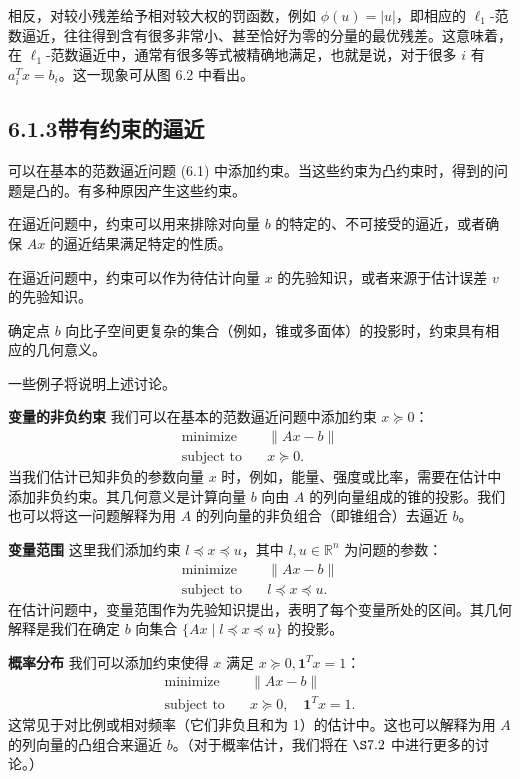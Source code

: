 \documentclass[UTF8,12pt,a4paper,fontset=fandol]{ctexart}
\begin{document}
相反，对较小残差给予相对较大权的罚函数，例如 $\phi(u)=|u|$，即相应的 $\ell_1$-范数逼近，往往得到含有很多非常小、甚至恰好为零的分量的最优残差。这意味着，在 $\ell_1$-范数逼近中，通常有很多等式被精确地满足，也就是说，对于很多 $i$ 有 $a_i^Tx=b_i$。这一现象可从图 6.2 中看出。

\subsection*{6.1.3\quad 带有约束的逼近}

可以在基本的范数逼近问题 (6.1) 中添加约束。当这些约束为凸约束时，得到的问题是凸的。有多种原因产生这些约束。

在逼近问题中，约束可以用来排除对向量 $b$ 的特定的、不可接受的逼近，或者确保 $Ax$ 的逼近结果满足特定的性质。

在逼近问题中，约束可以作为待估计向量 $x$ 的先验知识，或者来源于估计误差 $v$ 的先验知识。

确定点 $b$ 向比子空间更复杂的集合（例如，锥或多面体）的投影时，约束具有相应的几何意义。

一些例子将说明上述讨论。

\noindent\textbf{变量的非负约束}\quad
我们可以在基本的范数逼近问题中添加约束 $x\succeq 0$：
\[
\begin{aligned}
\text{minimize}\quad & \|Ax-b\|\\
\text{subject to}\quad & x\succeq 0.
\end{aligned}
\]
当我们估计已知非负的参数向量 $x$ 时，例如，能量、强度或比率，需要在估计中添加非负约束。其几何意义是计算向量 $b$ 向由 $A$ 的列向量组成的锥的投影。我们也可以将这一问题解释为用 $A$ 的列向量的非负组合（即锥组合）去逼近 $b$。

\noindent\textbf{变量范围}\quad
这里我们添加约束 $l\preceq x\preceq u$，其中 $l,u\in\mathbb{R}^n$ 为问题的参数：
\[
\begin{aligned}
\text{minimize}\quad & \|Ax-b\|\\
\text{subject to}\quad & l\preceq x\preceq u.
\end{aligned}
\]
在估计问题中，变量范围作为先验知识提出，表明了每个变量所处的区间。其几何解释是我们在确定 $b$ 向集合 $\{Ax\mid l\preceq x\preceq u\}$ 的投影。

\noindent\textbf{概率分布}\quad
我们可以添加约束使得 $x$ 满足 $x\succeq 0,\mathbf{1}^Tx=1$：
\[
\begin{aligned}
\text{minimize}\quad & \|Ax-b\|\\
\text{subject to}\quad & x\succeq 0,\quad \mathbf{1}^Tx=1.
\end{aligned}
\]
这常见于对比例或相对频率（它们非负且和为 1）的估计中。这也可以解释为用 $A$ 的列向量的凸组合来逼近 $b$。（对于概率估计，我们将在 $\S 7.2$ 中进行更多的讨论。）
\end{document}
